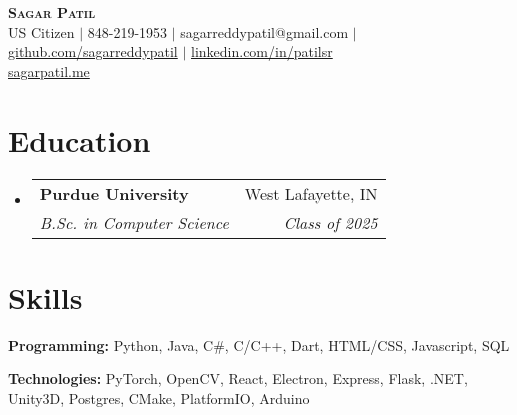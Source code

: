 \documentclass[letterpaper,11pt]{article}
\makeatletter
\newcommand{\resumeSubheading}[4]{
  \vspace{-2pt}\item
    \begin{tabular*}{0.97\textwidth}[t]{l@{\extracolsep{\fill}}r}
      \textbf{#1} & #2 \\
      \textit{\small#3} & \textit{\small #4} \\
    \end{tabular*}\vspace{-7pt}
}
\newcommand{\resumeSubHeadingListStart}{\begin{itemize}[leftmargin=0.15in, label={}]}
\newcommand{\resumeSubHeadingListEnd}{\end{itemize}}
\makeatother
\begin{document}

\begin{center}
  \textbf{\Huge \scshape Sagar Patil} \\ \vspace{3pt}
  \small
  US Citizen
  $|$
  \faMobile \hspace{.5pt} 848-219-1953
  $|$
  \faAt \hspace{.5pt} sagarreddypatil@gmail.com
  $|$
  \faGithub \hspace{.5pt} \href{https://www.github.com/sagarreddypatil}{github.com/sagarreddypatil}
  $|$
  \faLinkedinSquare \hspace{.5pt} \href{https://www.linkedin.com/in/patilsr}{linkedin.com/in/patilsr}
  \\ %
  \faGlobe \hspace{.5pt} \href{https://sagarpatil.me}{sagarpatil.me}
\end{center}




\section{Education}
\vspace{3pt}
\resumeSubHeadingListStart

\resumeSubheading
{Purdue University}{West Lafayette, IN}
{B.Sc. in Computer Science}{Class of 2025}

\resumeSubHeadingListEnd



\section{Skills}
\vspace{2pt}
\resumeSubHeadingListStart
\small{\item{
              \textbf{Programming: }{Python, Java, C\#, C/C++, Dart, HTML/CSS, Javascript, SQL} \\ \vspace{3pt}

              \textbf{Technologies: }{PyTorch, OpenCV, React, Electron, Express, Flask, .NET, Unity3D, Postgres, CMake, PlatformIO, Arduino} \\ \vspace{3pt}

        }}
\resumeSubHeadingListEnd
\end{document}
